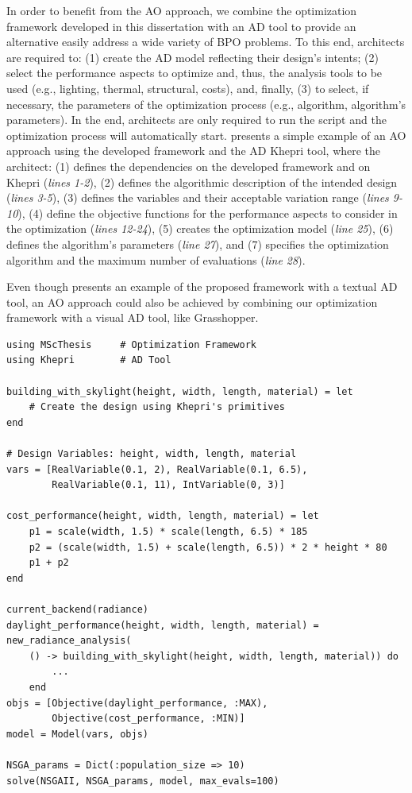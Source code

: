 In order to benefit from the \ac{AO} approach, we combine the optimization framework developed in this dissertation with an \ac{AD} tool to provide an alternative easily address a wide variety of \ac{BPO} problems. To this end, architects are required to: (1) create the \ac{AD} model reflecting their design's intents; (2) select the performance aspects to optimize and, thus, the analysis tools to be used (e.g., lighting, thermal, structural, costs), and, finally, (3) to select, if necessary, the parameters of the optimization process (e.g., algorithm, algorithm's parameters). In the end, architects are only required to run the script and the optimization process will automatically start.  presents a simple example of an \ac{AO} approach using the developed framework and the \ac{AD} Khepri tool, where the architect: (1) defines the dependencies on the developed framework and on Khepri (\textit{lines 1-2}), (2) defines the algorithmic description of the intended design (\textit{lines 3-5}), (3) defines the variables and their acceptable variation range (\textit{lines 9-10}), (4) define the objective functions for the performance aspects to consider in the optimization (\textit{lines 12-24}), (5) creates the optimization model (\textit{line 25}), (6) defines the algorithm's parameters (\textit{line 27}), and (7) specifies the optimization algorithm and the maximum number of evaluations (\textit{line 28}).

Even though  presents an example of the proposed framework with a textual \ac{AD} tool, an \ac{AO} approach could also be achieved by combining our optimization framework with a visual \ac{AD} tool, like Grasshopper. 

\begin{lstlisting}[caption={BPO example of the framework's API using the Khepri AD tool.},label=BPOjuliaCode]	
using MScThesis		# Optimization Framework
using Khepri  		# AD Tool

building_with_skylight(height, width, length, material) = let
	# Create the design using Khepri's primitives
end

# Design Variables: height, width, length, material
vars = [RealVariable(0.1, 2), RealVariable(0.1, 6.5),
 		RealVariable(0.1, 11), IntVariable(0, 3)]

cost_performance(height, width, length, material) = let
	p1 = scale(width, 1.5) * scale(length, 6.5) * 185
	p2 = (scale(width, 1.5) + scale(length, 6.5)) * 2 * height * 80
	p1 + p2
end

current_backend(radiance)
daylight_performance(height, width, length, material) =  new_radiance_analysis(
	() -> building_with_skylight(height, width, length, material)) do
		...
	end
objs = [Objective(daylight_performance, :MAX),
		Objective(cost_performance, :MIN)]
model = Model(vars, objs)

NSGA_params = Dict(:population_size => 10)
solve(NSGAII, NSGA_params, model, max_evals=100)
\end{lstlisting}

